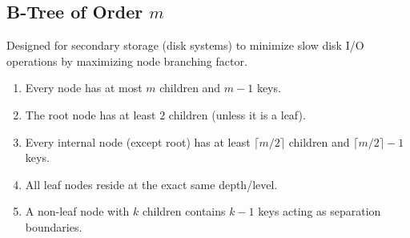 \documentclass[12pt,a4paper]{article}
\begin{document}
\subsection{B-Tree of Order $m$}
Designed for secondary storage (disk systems) to minimize slow disk I/O operations by maximizing node branching factor.
\begin{tcolorbox}[defbox, title={\textbf{Axiomatic Properties of B-Tree of Order $m$}}]
\begin{enumerate}[leftmargin=*, nosep]
  \item Every node has at most $m$ children and $m - 1$ keys.
  \item The root node has at least $2$ children (unless it is a leaf).
  \item Every internal node (except root) has at least $\lceil m/2 \rceil$ children and $\lceil m/2 \rceil - 1$ keys.
  \item All leaf nodes reside at the exact same depth/level.
  \item A non-leaf node with $k$ children contains $k - 1$ keys acting as separation boundaries.
\end{enumerate}
\end{tcolorbox}
\end{document}
